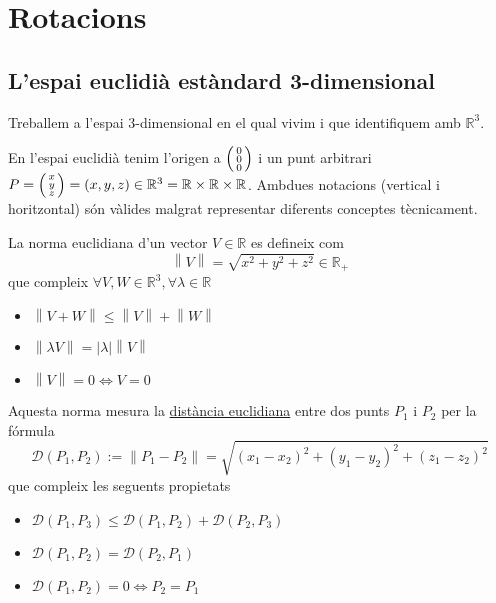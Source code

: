 \documentclass[a4paper,12pt]{article}
\begin{document}
	\section{Rotacions}
	\subsection{L'espai euclidià estàndard 3-dimensional}
	Treballem a l'espai 3-dimensional en el qual vivim i que identifiquem amb $\mathbb{R}^3$.
	\begin{notacio}
	    En l'espai euclidià tenim l'origen a $\begin{psmallmatrix}0\\0\\0\end{psmallmatrix}$ i un punt
	    arbitrari $P = \begin{psmallmatrix}x\\y\\z\end{psmallmatrix} = \left(x,y,z\right) \in \mathbb{R}^3 = \mathbb{R} \times \mathbb{R} \times \mathbb{R}$.
	    Ambdues notacions (vertical i horitzontal) són vàlides malgrat representar diferents conceptes
	    tècnicament.
	\end{notacio}
	\begin{definicio}
	    La norma euclidiana d'un vector $V \in \mathbb{R}$ es defineix com
		\begin{displaymath}
			\left\lVert V\right\rVert = \sqrt{x^2+y^2+z^2} \in \mathbb{R}_+
		\end{displaymath}
	    que compleix $\forall V, W \in \mathbb{R}^3, \forall \lambda \in \mathbb{R}$
	    \begin{itemize}
	        \item $\left\lVert V+W\right\rVert \leq \left\lVert V\right\rVert + \left\lVert W\right\rVert$
	        \item $\left\lVert \lambda V\right\rVert = \left\lvert \lambda\right\rvert\left\lVert V\right\rVert$
	        \item $\left\lVert V\right\rVert = 0\iff V = 0$
	    \end{itemize}
	    Aquesta norma mesura la \underline{distància euclidiana} entre dos punts $P_1$ i $P_2$ per la fórmula
	    \begin{displaymath}
			\mathcal{D}\left(P_1, P_2\right) := \left\lVert P_1 - P_2\right\rVert = \sqrt{\left(x_1-x_2\right)^2 + \left(y_1-y_2\right)^2 + \left(z_1-z_2\right)^2}
		\end{displaymath}
		que compleix les seguents propietats
	    \begin{itemize}
	        \item $\mathcal{D}\left(P_1, P_3\right) \leq \mathcal{D}\left(P_1, P_2\right) + \mathcal{D}\left(P_2, P_3\right)$
	        \item $\mathcal{D}\left(P_1, P_2\right) = \mathcal{D}\left(P_2, P_1\right)$
	        \item $\mathcal{D}\left(P_1, P_2\right) = 0 \iff P_2 = P_1$
	    \end{itemize}
	\end{definicio}
\end{document}
